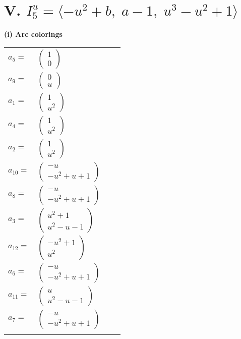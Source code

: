 \documentclass[1p]{elsarticle_modified}
\theoremstyle{definition}
\begin{document}
\centering \section*{V. $I^u_{5}= \langle - u^2+b,\;a-1,\;u^3- u^2+1 \rangle$}
\flushleft \textbf{(i) Arc colorings}\\
\begin{tabular}{m{7pt} m{180pt} m{7pt} m{180pt} }
\flushright $a_{5}=$&$\begin{pmatrix}1\\0\end{pmatrix}$ \\
\flushright $a_{9}=$&$\begin{pmatrix}0\\u\end{pmatrix}$ \\
\flushright $a_{1}=$&$\begin{pmatrix}1\\u^2\end{pmatrix}$ \\
\flushright $a_{4}=$&$\begin{pmatrix}1\\u^2\end{pmatrix}$ \\
\flushright $a_{2}=$&$\begin{pmatrix}1\\u^2\end{pmatrix}$ \\
\flushright $a_{10}=$&$\begin{pmatrix}- u\\- u^2+u+1\end{pmatrix}$ \\
\flushright $a_{8}=$&$\begin{pmatrix}- u\\- u^2+u+1\end{pmatrix}$ \\
\flushright $a_{3}=$&$\begin{pmatrix}u^2+1\\u^2- u-1\end{pmatrix}$ \\
\flushright $a_{12}=$&$\begin{pmatrix}- u^2+1\\u^2\end{pmatrix}$ \\
\flushright $a_{6}=$&$\begin{pmatrix}- u\\- u^2+u+1\end{pmatrix}$ \\
\flushright $a_{11}=$&$\begin{pmatrix}u\\u^2- u-1\end{pmatrix}$ \\
\flushright $a_{7}=$&$\begin{pmatrix}- u\\- u^2+u+1\end{pmatrix}$\\&\end{tabular}
\end{document}
